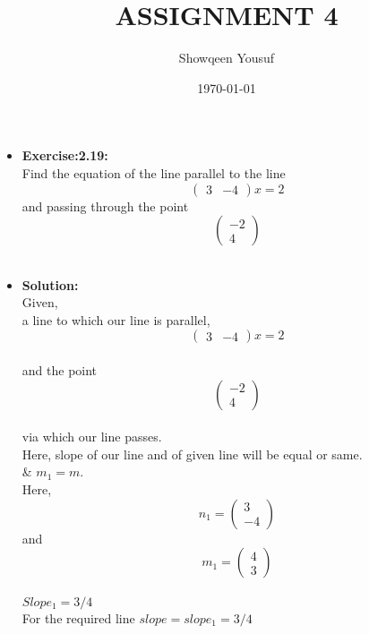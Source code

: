 \documentclass{article}
\begin{document}
\title{ASSIGNMENT 4}
\author{Showqeen Yousuf}
\date{\today}
\maketitle

\begin{itemize}

\item{\textbf{Exercise:2.19:}}\\

Find the equation of the line parallel to the line \[ \begin{pmatrix} 3 & -4\end{pmatrix}x =2\] and passing through the point\[ \begin{pmatrix} -2\\ 4\end{pmatrix}\]\\

\item{\textbf{Solution:}}\\

Given,\\
a line to which our line is parallel,
\[ \begin{pmatrix} 3 & -4\end{pmatrix}x =2\]\\
and  the point \[ \begin{pmatrix} -2\\ 4\end{pmatrix}\]\\ via which our line passes.\\

Here, slope of our line and of given line will be equal or same.\\

\therefore{}& $m_1=m$.\\

Here,
\[ n_1=\begin{pmatrix} 3 \\ -4\end{pmatrix}\] and\\
\[m_1= \begin{pmatrix} 4 \\ 3\end{pmatrix}\]\\

$Slope_1=3/4$\\

For the required line $slope=slope_1=3/4$\\


\end{itemize}
\end{document}
